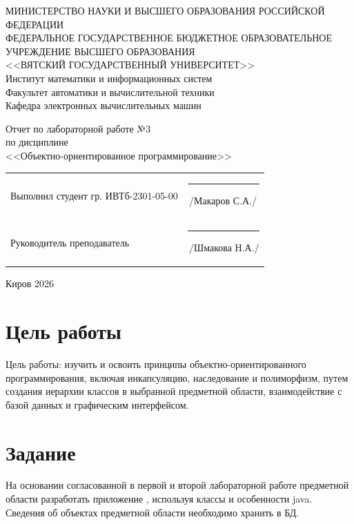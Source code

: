 \documentclass[a4paper,14pt]{extarticle}
\begin{document}
\newpage\thispagestyle{empty}
\begin{center}
  \MakeUppercase{
    Министерство науки и высшего образования Российской Федерации\\
    Федеральное государственное бюджетное образовательное учреждение высшего образования\\
    <<Вятский Государственный Университет>>\\
  }
  Институт математики и информационных систем\\
  Факультет автоматики и вычислительной техники\\
  Кафедра электронных вычислительных машин
\end{center}
\vfill

\begin{center}
  Отчет по лабораторной работе №3\\
  по дисциплине\\
  <<Объектно-ориентированное программирование>>\\
\end{center}
\vfill

\noindent
\begin{tabular}{ll}
  Выполнил студент гр. ИВТб-2301-05-00 \hspace{5mm} & \rule[-1mm]{25mm}{0.10mm}\,/Макаров С.А./ \\
  Руководитель преподаватель                        & \rule[-1mm]{25mm}{0.10mm}\,/Шмакова Н.А./ \\
\end{tabular}

\vfill
\begin{center}
  Киров 2026
\end{center}

\newpage
\section*{\hspace{12.5mm}Цель работы}
Цель работы: изучить и освоить принципы объектно-ориентированного программирования, включая инкапсуляцию, наследование и полиморфизм, путем создания иерархии классов в выбранной предметной области, взаимодействие с базой данных и графическим интерфейсом.

\section*{\hspace{12.5mm}Задание}
На основании согласованной в первой и второй лабораторной работе предметной области разработать приложение , используя классы и особенности java. Сведения об объектах предметной области необходимо хранить в БД.
\end{document}
